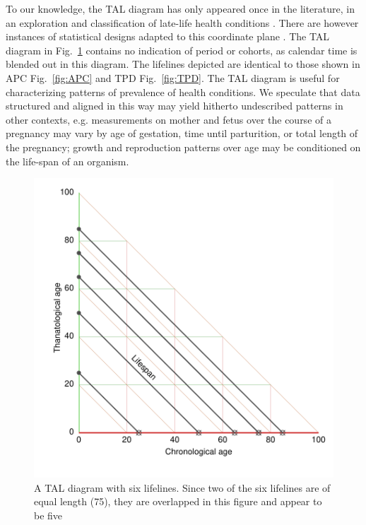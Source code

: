 \documentclass[12pt,oneside,a4paper]{article} %
\theoremstyle{definition}
\begin{document}
To our knowledge, the TAL diagram has only appeared once in the literature, in an exploration and classification of late-life health
conditions \citep{riffe2016ttd}. There are however instances of statistical
designs adapted to this coordinate plane \citep[see e.g.,][]{dempsey2016, Jewell2016}. The TAL diagram in Fig.~\ref{fig:TAL} contains no indication of
period or cohorts, as calendar time is blended out in this diagram.
The lifelines depicted are identical to those shown in APC Fig.~\ref{fig:APC}
and TPD Fig.~\ref{fig:TPD}. The TAL diagram is useful for characterizing patterns of prevalence of health conditions. We speculate
that data structured and aligned in this way may yield hitherto undescribed
patterns in other contexts, e.g. measurements on mother and fetus over the
course of a pregnancy may vary by age of gestation, time until parturition, or
total length of the pregnancy; growth and reproduction patterns over age may be conditioned on the life-span of an organism.

\begin{figure}[h!] 
\caption{A TAL diagram with six lifelines. Since two of the six lifelines are of equal length (75), they are
overlapped in this figure and appear to be five}
\label{fig:TAL}
\centering
\includegraphics[scale=0.7]{Figures/TALrt.pdf}
\end{figure} 
\end{document}

